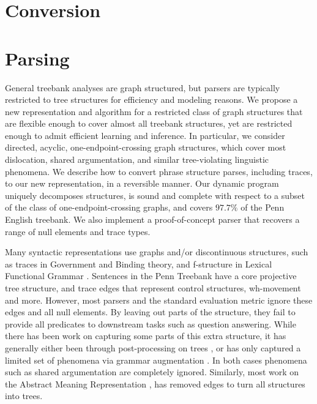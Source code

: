 \section{Conversion}

\section{Parsing}

General treebank analyses are graph structured, but parsers are typically restricted to tree structures for efficiency and modeling reasons.
We propose a new representation and algorithm for a restricted class of graph structures that are flexible enough to cover almost all treebank structures, yet are restricted enough to admit efficient learning and inference.
In particular, we consider directed, acyclic, one-endpoint-crossing graph structures, which cover most dislocation, shared argumentation, and similar tree-violating linguistic phenomena.
We describe how to convert phrase structure parses, including traces, to our new representation, in a reversible manner.
Our dynamic program uniquely decomposes structures, is sound and complete with respect to a subset of the class of one-endpoint-crossing graphs, and covers $97.7\%$ of the Penn English treebank.
We also implement a proof-of-concept parser that recovers a range of null elements and trace types.

Many syntactic representations use graphs and/or discontinuous structures, such as traces in Government and Binding theory, and f-structure in Lexical Functional Grammar \parencite{gb,Bresnan:1982}.
Sentences in the Penn Treebank \parencite{ptb} have a core projective tree structure, and trace edges that represent control structures, wh-movement and more.
However, most parsers and the standard evaluation metric ignore these edges and all null elements.
By leaving out parts of the structure, they fail to provide all predicates to downstream tasks such as question answering.
While there has been work on capturing some parts of this extra structure, it has generally either been through post-processing on trees
\parencite{Johnson:2002,Jijkoun:2003,Campbell:2004,Levy:2004,Gabbard:2006},
or has only captured a limited set of phenomena via grammar augmentation
\parencite{collins:1997,dienes-dubey:2003,schmid:2006,cai-chiang-goldberg:2011}.
In both cases phenomena such as shared argumentation are completely ignored.
Similarly, most work on the Abstract Meaning Representation \parencite{amr}, has removed edges to turn all structures into trees.

